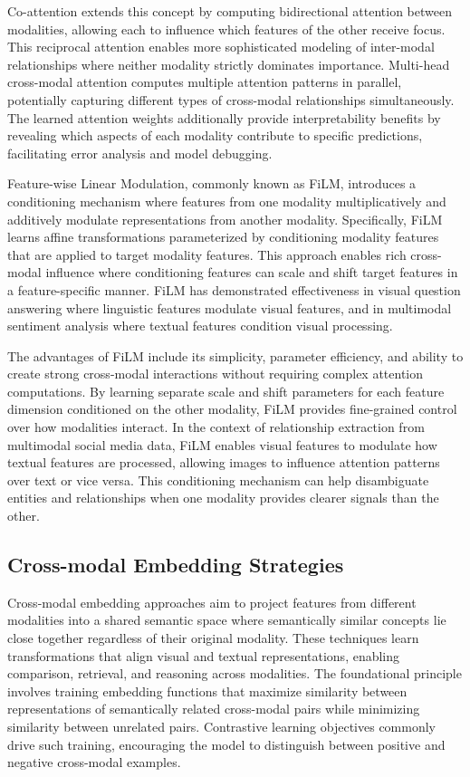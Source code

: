 \documentclass[12pt,a4paper]{report}
\begin{document}
Co-attention extends this concept by computing bidirectional attention between modalities, allowing each to influence which features of the other receive focus. This reciprocal attention enables more sophisticated modeling of inter-modal relationships where neither modality strictly dominates importance. Multi-head cross-modal attention computes multiple attention patterns in parallel, potentially capturing different types of cross-modal relationships simultaneously. The learned attention weights additionally provide interpretability benefits by revealing which aspects of each modality contribute to specific predictions, facilitating error analysis and model debugging.

Feature-wise Linear Modulation, commonly known as FiLM, introduces a conditioning mechanism where features from one modality multiplicatively and additively modulate representations from another modality. Specifically, FiLM learns affine transformations parameterized by conditioning modality features that are applied to target modality features. This approach enables rich cross-modal influence where conditioning features can scale and shift target features in a feature-specific manner. FiLM has demonstrated effectiveness in visual question answering where linguistic features modulate visual features, and in multimodal sentiment analysis where textual features condition visual processing.

The advantages of FiLM include its simplicity, parameter efficiency, and ability to create strong cross-modal interactions without requiring complex attention computations. By learning separate scale and shift parameters for each feature dimension conditioned on the other modality, FiLM provides fine-grained control over how modalities interact. In the context of relationship extraction from multimodal social media data, FiLM enables visual features to modulate how textual features are processed, allowing images to influence attention patterns over text or vice versa. This conditioning mechanism can help disambiguate entities and relationships when one modality provides clearer signals than the other.

\subsection{Cross-modal Embedding Strategies}

Cross-modal embedding approaches aim to project features from different modalities into a shared semantic space where semantically similar concepts lie close together regardless of their original modality. These techniques learn transformations that align visual and textual representations, enabling comparison, retrieval, and reasoning across modalities. The foundational principle involves training embedding functions that maximize similarity between representations of semantically related cross-modal pairs while minimizing similarity between unrelated pairs. Contrastive learning objectives commonly drive such training, encouraging the model to distinguish between positive and negative cross-modal examples.
\end{document}

